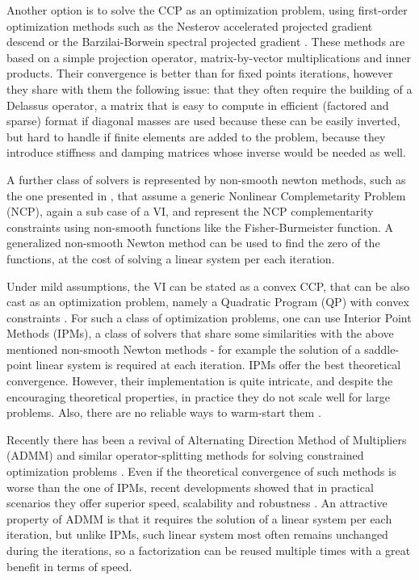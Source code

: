 \documentclass{svproc}
\begin{document}
Another option is to solve the CCP as an optimization problem, using first-order optimization methods such as 
the Nesterov accelerated projected gradient descend  
\cite{hammadTOG2015}
or the Barzilai-Borwein spectral projected gradient
\cite{heynIJNME2013}. These methods are based on a simple projection operator,  matrix-by-vector multiplications and inner products. Their convergence is better than for fixed points iterations, however they share with them the following issue: that they often require the building of a Delassus operator, a matrix that is easy to compute in efficient (factored and sparse) format if diagonal masses are used because these can be easily inverted, but hard to handle if finite elements are added to the problem, because they introduce stiffness and damping matrices whose inverse would be needed as well.

A further class of solvers is represented by non-smooth newton methods, such as the one presented in 
\cite{Macklin2019} %
, that assume a generic Nonlinear Complemetarity Problem (NCP), again a sub case of a VI, and represent the NCP complementarity constraints using non-smooth functions like the Fisher-Burmeister function. A generalized non-smooth Newton method can be used to find the zero of the functions, at the cost of solving a linear system per each iteration.

Under mild assumptions, the VI can be stated as a convex CCP, that can be also cast as an optimization problem, namely a Quadratic Program (QP) with convex constraints \cite{anitescuTasora2008}. For such a class of optimization problems, one can use Interior Point Methods (IPMs), a class of solvers that share some similarities with the above mentioned non-smooth Newton methods - for example the solution of a saddle-point linear system is required at each iteration. IPMs offer the best theoretical convergence. However, their implementation is quite intricate, and despite the encouraging theoretical properties, in practice they do not scale well for large problems. Also, there are no reliable ways to warm-start them
\cite{Mangoni2018}
.

Recently there has been a revival of Alternating Direction Method of Multipliers (ADMM) and similar operator-splitting methods for solving constrained optimization problems
\cite{Goldstein2014}. %
Even if the theoretical convergence of such methods is worse than the one of IPMs, recent developments showed that in practical scenarios they offer superior speed, scalability and robustness 
\cite{Cannon2019}. %
An attractive property of ADMM is that it requires the solution of a linear system per each iteration, but unlike IPMs, such linear system most often remains unchanged during the iterations, so a factorization can be reused multiple times with a great benefit in terms of speed.
\end{document}
